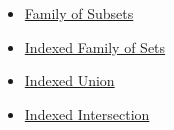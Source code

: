 \begin{dependencies}
\begin{itemize}
  \item \hyperref[def:family-of-subsets]{Family of Subsets}
  \item \hyperref[def:indexed-family]{Indexed Family of Sets}
  \item \hyperref[def:indexed-union]{Indexed Union}
  \item \hyperref[def:indexed-intersection]{Indexed Intersection}
\end{itemize}
\end{dependencies}
